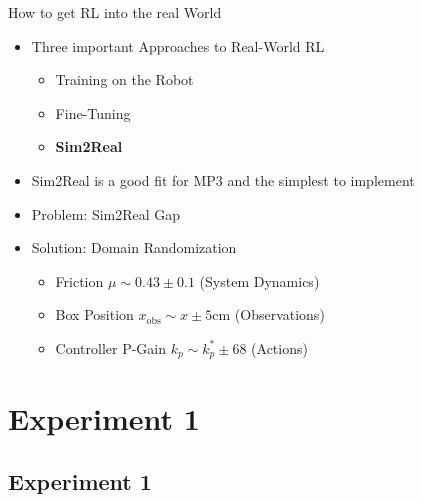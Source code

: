 \documentclass[16:9,en,navbarinfooter]{sdqbeamer}
\begin{document}
\begin{frame}{How to get RL into the real World}
	\begin{itemize}
		\item Three important Approaches to Real-World RL
		      \begin{itemize}
			      \item Training on the Robot
			      \item Fine-Tuning
			      \item \textbf{Sim2Real}
		      \end{itemize}
		\item Sim2Real is a good fit for MP3 and the simplest to implement
		\item Problem: Sim2Real Gap
		\item Solution: Domain Randomization
		      \begin{itemize}
			      \item Friction $\mu \sim 0.43 \pm 0.1$ \quad (System Dynamics)
			      \item Box Position $x_\text{obs} \sim x \pm 5$cm \quad (Observations)
			      \item Controller P-Gain $k_p \sim k_p^* \pm 68$ \quad (Actions)
		      \end{itemize}

	\end{itemize}

\end{frame}



\section{Experiment 1}
\subsection{Experiment 1}
\end{document}
